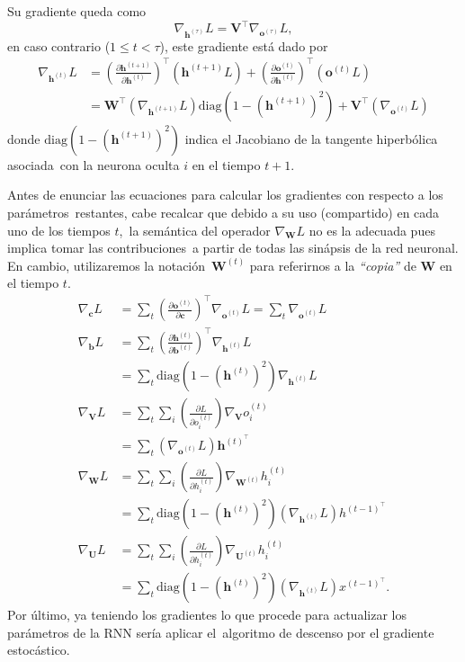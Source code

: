 Su gradiente queda como
\begin{equation}
  \nabla_{\mathbf{h}^{(\tau)}}L = \mathbf{V}^\top \nabla_{\mathbf{o}^{(\tau)}} L,
\end{equation}
en caso contrario ($1 \leq t < \tau$), este gradiente está dado por
\begin{align}
  \nabla_{\mathbf{h}^{(t)}}L &=
  \left(\frac{\partial\mathbf{h}^{(t+1)}}{\partial\mathbf{h}^{(t)}}\right)^\top (\mathbf{h}^{(t+1)}L) +
  \left(\frac{\partial\mathbf{o}^{(t)}}{\partial\mathbf{h}^{(t)}}\right)^\top (\mathbf{o}^{(t)}L)\\
  &= \mathbf{W}^\top (\nabla_{\mathbf{h}^{(t+1)}}L) \text{diag}(1 - (\mathbf{h}^{(t+1)})^2) +
  \mathbf{V}^\top (\nabla_{\mathbf{o}^{(t)}}L)
\end{align}
donde $\text{diag}(1 - (\mathbf{h}^{(t+1)})^2)$ indica el Jacobiano de la tangente hiperbólica asociada\
con la neurona oculta $i$ en el tiempo $t+1$.\par
Antes de enunciar las ecuaciones para calcular los gradientes con respecto a los parámetros\
restantes, cabe recalcar que debido a su uso (compartido) en cada uno de los tiempos $t$,\
la semántica del operador $\nabla_{\mathbf{W}}L$ no es la adecuada pues implica tomar las contribuciones\
a partir de todas las sinápsis de la red neuronal. En cambio, utilizaremos la notación\
$\mathbf{W}^{(t)}$ para referirnos a la \emph{``copia''} de $\mathbf{W}$ en el tiempo $t$.
\begin{align}
  \nabla_{\mathbf{c}}L &= \sum_t \left(\frac{\partial \mathbf{o}^{(t)}}{\partial \mathbf{c}}\right)^\top \nabla_{\mathbf{o}^{(t)}}L =
  \sum_t \nabla_{\mathbf{o}^{(t)}}L\\
  \nabla_{\mathbf{b}}L &= \sum_t \left(\frac{\partial \mathbf{h}^{(t)}}{\partial \mathbf{b}^{(t)}}\right)^\top \nabla_{\mathbf{h}^{(t)}}L\\
  &= \sum_t \text{diag}(1 - (\mathbf{h}^{(t)})^2) \nabla_{\mathbf{h}^{(t)}}L\\
  \nabla_{\mathbf{V}}L &= \sum_t \sum_i \left(\frac{\partial L}{\partial o_i^{(t)}}\right) \nabla_{\mathbf{V}}o_i^{(t)}\\
  &= \sum_t (\nabla_{\mathbf{o}^{(t)}}L) \mathbf{h}^{(t)^\top}\\
  \nabla_{\mathbf{W}}L &= \sum_t \sum_i\left(\frac{\partial L}{\partial h_i^{(t)}}\right) \nabla_{\mathbf{W}^{(t)}}h_i^{(t)}\\
  &= \sum_t \text{diag}(1 - (\mathbf{h}^{(t)})^2) (\nabla_{\mathbf{h}^{(t)}}L) h^{(t-1)^\top}\\
  \nabla_{\mathbf{U}}L &= \sum_t \sum_i\left(\frac{\partial L}{\partial h_i^{(t)}}\right) \nabla_{\mathbf{U}^{(t)}}h_i^{(t)}\\
  &= \sum_t \text{diag}(1 - (\mathbf{h}^{(t)})^2) (\nabla_{\mathbf{h}^{(t)}}L) x^{(t-1)^\top}.
\end{align}
Por último, ya teniendo los gradientes lo que procede para actualizar los parámetros de la RNN sería aplicar el\
algoritmo de descenso por el gradiente estocástico.

